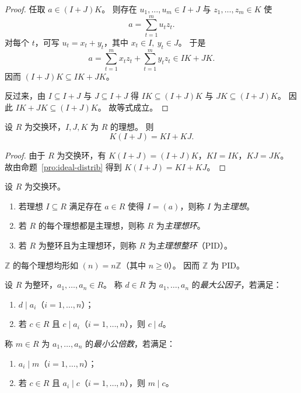 \documentclass[lang=cn,a4paper,newtx]{elegantbook}
\begin{document}
\begin{proof}
  任取 $a\in (I+J)K$。
  则存在 $u_1,\dots,u_m\in I+J$ 与 $z_1,\dots,z_m\in K$ 使
  \[
    a=\sum_{t=1}^m u_t z_t.
  \]
  对每个 $t$，可写 $u_t=x_t+y_t$，其中 $x_t\in I,\ y_t\in J$。
  于是
  \[
    a=\sum_{t=1}^m x_tz_t+\sum_{t=1}^m y_tz_t\in IK+JK.
  \]
  因而 $(I+J)K\subseteq IK+JK$。

  反过来，由 $I\subseteq I+J$ 与 $J\subseteq I+J$ 得 $IK\subseteq (I+J)K$ 与 $JK\subseteq (I+J)K$。
  因此 $IK+JK\subseteq (I+J)K$。
  故等式成立。
\end{proof}

\begin{proposition}
  设 $R$ 为交换环，$I,J,K$ 为 $R$ 的理想。
  则
  \[
    K(I+J)=KI+KJ.
  \]
\end{proposition}

\begin{proof}
  由于 $R$ 为交换环，有 $K(I+J)=(I+J)K$，$KI=IK$，$KJ=JK$。
  故由命题~\ref{pro:ideal-distrib} 得到 $K(I+J)=KI+KJ$。
\end{proof}

\begin{definition}
  设 $R$ 为交换环。
  \begin{enumerate}
    \item 若理想 $I\subseteq R$ 满足存在 $a\in R$ 使得 $I=(a)$，则称 $I$ 为\emph{主理想}。
    \item 若 $R$ 的每个理想都是主理想，则称 $R$ 为\emph{主理想环}。
    \item 若 $R$ 为整环且为主理想环，则称 $R$ 为\emph{主理想整环}（PID）。
  \end{enumerate}
\end{definition}

\begin{example}
  $\mathbb{Z}$ 的每个理想均形如 $(n)=n\mathbb{Z}$（其中 $n\ge 0$）。
  因而 $\mathbb{Z}$ 为 PID。
\end{example}

\begin{definition}
  设 $R$ 为整环，$a_1,\dots,a_n\in R$。
  称 $d\in R$ 为 $a_1,\dots,a_n$ 的\emph{最大公因子}，若满足：
  \begin{enumerate}
    \item $d\mid a_i$（$i=1,\dots,n$）；
    \item 若 $c\in R$ 且 $c\mid a_i$（$i=1,\dots,n$），则 $c\mid d$。
  \end{enumerate}
  称 $m\in R$ 为 $a_1,\dots,a_n$ 的\emph{最小公倍数}，若满足：
  \begin{enumerate}
    \item $a_i\mid m$（$i=1,\dots,n$）；
    \item 若 $c\in R$ 且 $a_i\mid c$（$i=1,\dots,n$），则 $m\mid c$。
  \end{enumerate}
\end{definition}
\end{document}
